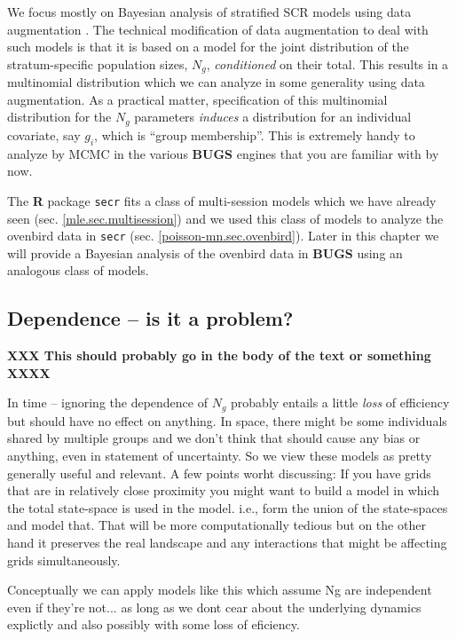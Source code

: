 We focus mostly on Bayesian analysis of stratified SCR models using
data augmentation \citep{royle_etal:2012arXiv,royle_converse:2012}. 
The technical modification of data augmentation to deal with such
models is that it is based on a model for the joint distribution of
the stratum-specific population sizes, 
$N_{g}$, {\it conditioned} on their total. This results in a 
multinomial distribution which we can analyze in some generality using data
augmentation.  As a practical matter, specification of this multinomial
distribution for the $N_{g}$ parameters {\it induces} a distribution
for an individual covariate, say $g_{i}$, which is ``group membership''. 
This is extremely handy to analyze by MCMC in the various {\bf BUGS}
engines that you are familiar with by now.

The {\bf R} package \mbox{\tt secr} fits a class of multi-session
models which we have already seen (sec. \ref{mle.sec.multisession})
and we used this class of models to analyze the ovenbird data in
\mbox{\tt secr} (sec. \ref{poisson-mn.sec.ovenbird}). Later in this
chapter we will provide a Bayesian analysis of the ovenbird data in
{\bf BUGS} using an analogous class of models.


\subsection{Dependence -- is it a problem?}

{\bf XXX This should probably go in the body of the text or something XXXX}

In time -- ignoring the dependence of $N_{g}$ probably entails a
little {\it loss} of efficiency but should have no effect on anything.
In space, there might be some individuals shared by multiple groups
and we don't think that should cause any bias or anything, even in
statement of uncertainty. So we view these models as pretty generally
useful and relevant.
A few points worht discussing: If you have grids that are in
relatively close proximity you might want to build a model in which
the total state-space is used in the model. i.e., form the union of
the state-spaces and model that. That will be more computationally
tedious but on the other hand it preserves the real landscape and any
interactions that might be affecting grids simultaneously. 


Conceptually we can apply models like this which assume Ng are
independent even if they're not... as long as we dont cear about the
underlying dynamics explictly and also possibly with some loss of
eficiency. 

